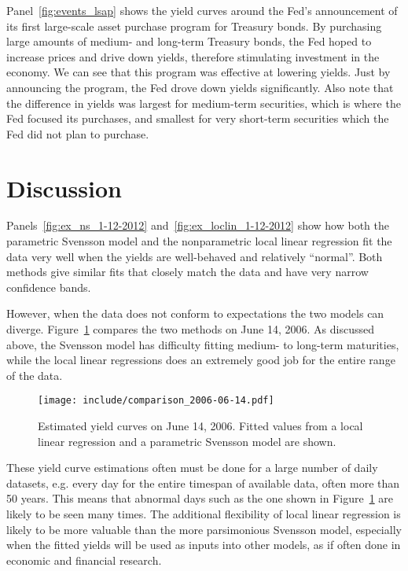\documentclass[12pt]{article}
\begin{document}
Panel~\ref{fig:events_lsap} shows the yield curves around the Fed's announcement of its first large-scale asset purchase program for Treasury bonds. By purchasing large amounts of medium- and long-term Treasury bonds, the Fed hoped to increase prices and drive down yields, therefore stimulating investment in the economy. We can see that this program was effective at lowering yields. Just by announcing the program, the Fed drove down yields significantly. Also note that the difference in yields was largest for medium-term securities, which is where the Fed focused its purchases, and smallest for very short-term securities which the Fed did not plan to purchase.


\section{Discussion}

Panels~\ref{fig:ex_ns_1-12-2012} and~\ref{fig:ex_loclin_1-12-2012} show how both the parametric Svensson model and the nonparametric local linear regression fit the data very well when the yields are well-behaved and relatively ``normal''. Both methods give similar fits that closely match the data and have very narrow confidence bands.

However, when the data does not conform to expectations the two models can diverge. Figure~\ref{fig:comparison_bad} compares the two methods on June 14, 2006. As discussed above, the Svensson model has difficulty fitting medium- to long-term maturities, while the local linear regressions does an extremely good job for the entire range of the data.

\begin{figure}[htb]
    \centering
    \texttt{[image: include/comparison\_2006-06-14.pdf]}
    \caption{Estimated yield curves on June 14, 2006. Fitted values from a local linear regression and a parametric Svensson model are shown.}
    \label{fig:comparison_bad}
\end{figure}

These yield curve estimations often must be done for a large number of daily datasets, e.g. every day for the entire timespan of available data, often more than 50 years. This means that abnormal days such as the one shown in Figure~\ref{fig:comparison_bad} are likely to be seen many times. The additional flexibility of local linear regression is likely to be more valuable than the more parsimonious Svensson model, especially when the fitted yields will be used as inputs into other models, as if often done in economic and financial research.


\FloatBarrier


\end{document}
